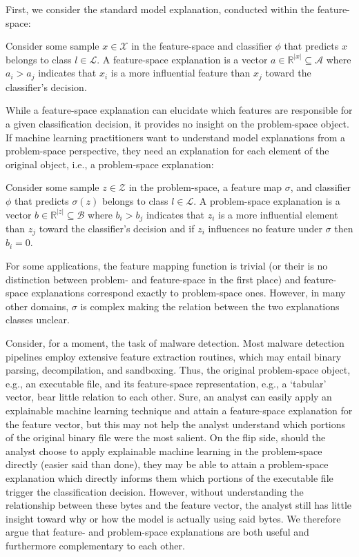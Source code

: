 First, we consider the standard model explanation, conducted within the feature-space:

\label{def:FeatureSpaceExplanation}
{
Consider some sample $x \in \mathcal{X}$ in the feature-space and classifier $\phi$ that predicts $x$ belongs to class $l \in \mathcal{L}$. A feature-space explanation is a vector $a \in \mathbb{R}^{|x|} \subseteq \mathcal{A}$ where $a_i > a_j$ indicates that $x_i$ is a more influential feature than $x_j$ toward the classifier's decision.
}

While a feature-space explanation can elucidate which features are responsible for a given classification decision, it provides no insight on the problem-space object. If machine learning practitioners want to understand model explanations from a problem-space perspective, they need an explanation for each element of the original object, i.e., a problem-space explanation:

\label{def:ProblemSpaceExplanation}
{
Consider some sample $z \in \mathcal{Z}$ in the problem-space, a feature map $\sigma$, and classifier $\phi$ that predicts $\sigma(z)$ belongs to class $l \in \mathcal{L}$. A problem-space explanation is a vector $b \in \mathbb{R}^{|z|} \subseteq \mathcal{B}$ where $b_i > b_j$ indicates that $z_i$ is a more influential element than $z_j$ toward the classifier's decision and if $z_i$ influences no feature under $\sigma$ then $b_i=0$.
}

For some applications, the feature mapping function is trivial (or their is no distinction between problem- and feature-space in the first place) and feature-space explanations correspond exactly to problem-space ones. However, in many other domains, $\sigma$ is complex making the relation between the two explanations classes unclear.

Consider, for a moment, the task of malware detection. Most malware detection pipelines employ extensive feature extraction routines, which may entail binary parsing, decompilation, and sandboxing. Thus, the original problem-space object, e.g., an executable file, and its feature-space representation, e.g., a `tabular' vector, bear little relation to each other. Sure, an analyst can easily apply an explainable machine learning technique and attain a feature-space explanation for the feature vector, but this may not help the analyst understand which portions of the original binary file were the most salient. On the flip side, should the analyst choose to apply explainable machine learning in the problem-space directly (easier said than done), they may be able to attain a problem-space explanation which directly informs them which portions of the executable file trigger the classification decision. However, without understanding the relationship between these bytes and the feature vector, the analyst still has little insight toward why or how the model is actually using said bytes. We therefore argue that feature- and problem-space explanations are both useful and furthermore complementary to each other.

